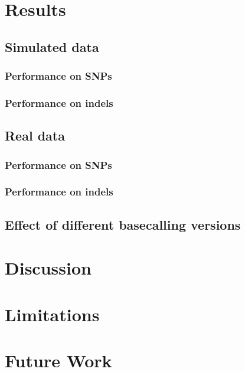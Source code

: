\section{Results}
\label{section1.3}

\subsection{Simulated data}

\subsubsection{Performance on SNPs}

\subsubsection{Performance on indels}

\subsection{Real data}

\subsubsection{Performance on SNPs}

\subsubsection{Performance on indels}

\subsection{Effect of different basecalling versions}

\section{Discussion}

\section{Limitations}

\section{Future Work}
